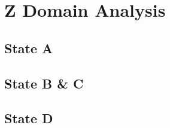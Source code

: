 \label{ch:ZDomainAnalysis}
\chapter{Z Domain Analysis}

\section{State A}


\section{State B \& C}


\section{State D}

